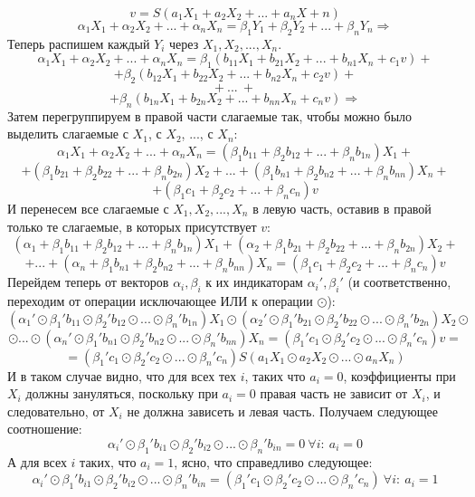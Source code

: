 \documentclass[a4paper,12pt]{extarticle}
\theoremstyle{plain} %
\begin{document}
\begin{large}
$$v = S(a_1X_1 + a_2X_2 + ... + a_nX+n)$$
$$\alpha_1X_1 + \alpha_2X_2 + ... + \alpha_nX_n = \beta_1Y_1 + \beta_2Y_2 + ... + \beta_nY_n \Rightarrow$$
Теперь распишем каждый $Y_i$ через $X_1, X_2, ..., X_n$.
$$\alpha_1X_1 + \alpha_2X_2 + ... + \alpha_nX_n = \beta_1(b_{11}X_1 + b_{21}X_2 + ... + b_{n1}X_n + c_1v) +$$
$$ +  \beta_2(b_{12}X_1 + b_{22}X_2 + ... + b_{n2}X_n + c_2v) +$$
$$+~ ...~ +$$
$$+ \beta_n(b_{1n}X_1 + b_{2n}X_2 + ... + b_{nn}X_n + c_nv) \Rightarrow$$
Затем перегруппируем в правой части слагаемые так, чтобы можно было выделить слагаемые с $X_1$, с $X_2$, ..., с $X_n$:
$$\alpha_1X_1 + \alpha_2X_2 + ... + \alpha_nX_n = (\beta_1b_{11} + \beta_2b_{12} + ... + \beta_nb_{1n})X_1 + $$
$$+(\beta_1b_{21} + \beta_2b_{22} + ... + \beta_nb_{2n})X_2 + ... + (\beta_1b_{n1} + \beta_2b_{n2} + ... + \beta_nb_{nn})X_n+$$
$$+ (\beta_1c_1 + \beta_2c_2 + ... + \beta_nc_n)v$$
И перенесем все слагаемые с $X_1, X_2, ..., X_n$ в левую часть, оставив в правой только те слагаемые, в которых присутствует $v$:
$$ (\alpha_1 + \beta_1b_{11} + \beta_2b_{12} + ... + \beta_nb_{1n})X_1 + (\alpha_2 + \beta_1b_{21} + \beta_2b_{22} + ... + \beta_nb_{2n})X_2 + $$
$$+...+ (\alpha_n + \beta_1b_{n1} + \beta_2b_{n2} + ... + \beta_nb_{nn})X_n =  (\beta_1c_1 + \beta_2c_2 + ... + \beta_nc_n)v$$
Перейдем теперь от векторов $\alpha_i, \beta_i$ к их индикаторам $\alpha_i', \beta_i'$ (и соответственно, переходим от операции исключающее ИЛИ к операции $\odot$):
$$ (\alpha_1' \odot \beta_1'b_{11} \odot \beta_2'b_{12} \odot ... \odot \beta_n'b_{1n})X_1 \odot (\alpha_2' \odot \beta_1'b_{21} \odot \beta_2'b_{22} \odot ... \odot \beta_n'b_{2n})X_2 \odot $$
$$\odot...\odot (\alpha_n' \odot \beta_1'b_{n1} \odot \beta_2'b_{n2} \odot ... \odot \beta_n'b_{nn})X_n =  (\beta_1'c_1 \odot \beta_2'c_2 \odot ... \odot \beta_n'c_n)v = $$
\begin{equation}\label{eq:not_final_lin}=(\beta_1'c_1 \odot \beta_2'c_2 \odot ... \odot \beta_n'c_n)S(a_1X_1 \odot a_2X_2 \odot ... \odot a_nX_n)\end{equation}
И в таком случае видно, что для всех тех $i$, таких что $a_i = 0$, коэффициенты при $X_i$ должны зануляться, поскольку при $a_i = 0$ правая часть не зависит от $X_i$, и следовательно, от $X_i$ не должна зависеть и левая часть. Получаем следующее соотношение: 
$$\alpha_i' \odot \beta_1'b_{i1} \odot \beta_2'b_{i2} \odot ... \odot \beta_n'b_{in} = 0 ~ \forall i: ~a_i = 0$$
А для всех $i$ таких, что $a_i = 1$, ясно, что справедливо следующее:
$$\alpha_i' \odot \beta_1'b_{i1} \odot \beta_2'b_{i2} \odot ... \odot \beta_n'b_{in} = (\beta_1'c_1 \odot \beta_2'c_2 \odot ... \odot \beta_n'c_n) ~ \forall i: ~a_i = 1$$

\end{large}
\end{document}
